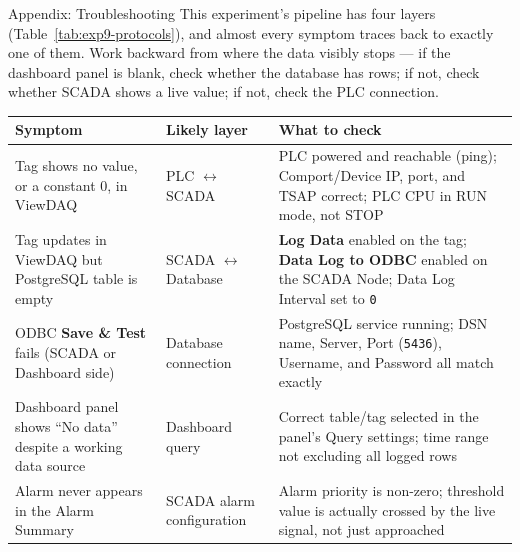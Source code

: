 \begin{labsection}{Appendix: Troubleshooting}{}
  This experiment's pipeline has four layers (Table~\ref{tab:exp9-protocols}), and almost every symptom traces back to exactly one of them. Work backward from where the data visibly stops --- if the dashboard panel is blank, check whether the database has rows; if not, check whether SCADA shows a live value; if not, check the PLC connection.
  \vspace*{0.5em}

  \needspace{6cm}
  \begin{boxedtable}
    \label{tab:exp9-troubleshooting}
    \centering
    {\renewcommand{\arraystretch}{1.3}
      \begin{tabular}{p{4.2cm}p{4.2cm}p{5.5cm}}
        \toprule
        Symptom                                                         & Likely layer                     & What to check                                                                                                                  \\
        \midrule
        Tag shows no value, or a constant 0, in ViewDAQ                 & PLC $\leftrightarrow$ SCADA      & PLC powered and reachable (ping); Comport/Device IP, port, and TSAP correct; PLC CPU in RUN mode, not STOP                     \\
        Tag updates in ViewDAQ but PostgreSQL table is empty            & SCADA $\leftrightarrow$ Database & \textbf{Log Data} enabled on the tag; \textbf{Data Log to ODBC} enabled on the SCADA Node; Data Log Interval set to \texttt{0} \\
        ODBC \textbf{Save \& Test} fails (SCADA or Dashboard side)      & Database connection              & PostgreSQL service running; DSN name, Server, Port (\texttt{5436}), Username, and Password all match exactly                   \\
        Dashboard panel shows ``No data'' despite a working data source & Dashboard query                  & Correct table/tag selected in the panel's Query settings; time range not excluding all logged rows                             \\
        Alarm never appears in the Alarm Summary                        & SCADA alarm configuration        & Alarm priority is non-zero; threshold value is actually crossed by the live signal, not just approached                        \\
        \bottomrule
      \end{tabular}
    }
  \end{boxedtable}


\end{labsection}
